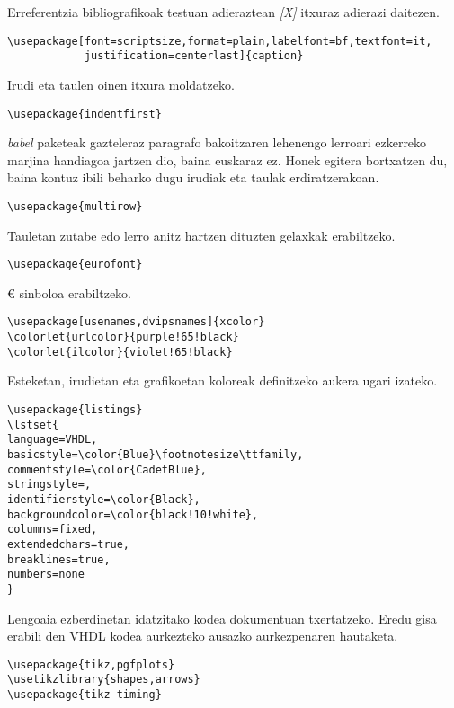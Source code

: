 Erreferentzia bibliografikoak testuan adieraztean \emph{[X]} itxuraz adierazi daitezen.

\begin{verbatim}
\usepackage[font=scriptsize,format=plain,labelfont=bf,textfont=it,
            justification=centerlast]{caption}
\end{verbatim}

Irudi eta taulen oinen itxura moldatzeko.

\begin{verbatim}
\usepackage{indentfirst}
\end{verbatim}

\emph{babel} paketeak gazteleraz paragrafo bakoitzaren lehenengo lerroari ezkerreko marjina handiagoa jartzen dio, baina euskaraz ez. Honek egitera bortxatzen du, baina kontuz ibili beharko dugu irudiak eta taulak erdiratzerakoan.

\begin{verbatim}
\usepackage{multirow}
\end{verbatim}

Tauletan zutabe edo lerro anitz hartzen dituzten gelaxkak erabiltzeko.

\begin{verbatim}
\usepackage{eurofont}
\end{verbatim}

\euro{} sinboloa erabiltzeko.

\begin{verbatim}
\usepackage[usenames,dvipsnames]{xcolor}
\colorlet{urlcolor}{purple!65!black}
\colorlet{ilcolor}{violet!65!black}
\end{verbatim}

Esteketan, irudietan eta grafikoetan koloreak definitzeko aukera ugari izateko.

\begin{verbatim}
\usepackage{listings}
\lstset{
language=VHDL,
basicstyle=\color{Blue}\footnotesize\ttfamily,
commentstyle=\color{CadetBlue},
stringstyle=,
identifierstyle=\color{Black},
backgroundcolor=\color{black!10!white},
columns=fixed,
extendedchars=true,
breaklines=true,
numbers=none
}
\end{verbatim}

Lengoaia ezberdinetan idatzitako kodea dokumentuan txertatzeko. Eredu gisa erabili den VHDL kodea aurkezteko ausazko aurkezpenaren hautaketa.

\begin{verbatim}
\usepackage{tikz,pgfplots}
\usetikzlibrary{shapes,arrows}
\usepackage{tikz-timing}
\end{verbatim}

